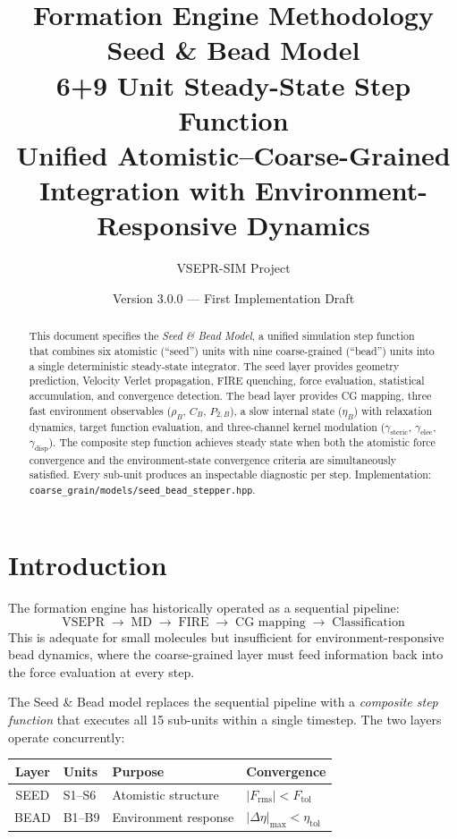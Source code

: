 \documentclass[11pt, a4paper, oneside]{article}
\title{%
  \textbf{Formation Engine Methodology}\\[6pt]
  \textbf{Seed \& Bead Model}\\[10pt]
  \large 6+9 Unit Steady-State Step Function\\[4pt]
  \normalsize Unified Atomistic–Coarse-Grained Integration with
              Environment-Responsive Dynamics
}
\author{VSEPR-SIM Project}
\date{Version 3.0.0 — First Implementation Draft}
\newcommand{\file}[1]{\texttt{#1}}
\begin{document}
\maketitle

\begin{abstract}
This document specifies the \emph{Seed \& Bead Model}, a unified
simulation step function that combines six atomistic (``seed'') units
with nine coarse-grained (``bead'') units into a single deterministic
steady-state integrator.  The seed layer provides geometry prediction,
Velocity Verlet propagation, FIRE quenching, force evaluation,
statistical accumulation, and convergence detection.  The bead layer
provides CG mapping, three fast environment observables ($\rho_B$,
$C_B$, $P_{2,B}$), a slow internal state ($\eta_B$) with relaxation
dynamics, target function evaluation, and three-channel kernel
modulation ($\gamma_{\text{steric}}$, $\gamma_{\text{elec}}$,
$\gamma_{\text{disp}}$).  The composite step function achieves
steady state when both the atomistic force convergence and the
environment-state convergence criteria are simultaneously satisfied.
Every sub-unit produces an inspectable diagnostic per step.
Implementation: \file{coarse\_grain/models/seed\_bead\_stepper.hpp}.
\end{abstract}

\tableofcontents
\newpage

\section{Introduction}
\label{sec:introduction}

The formation engine has historically operated as a sequential pipeline:
%
\[
  \text{VSEPR} \;\to\; \text{MD} \;\to\; \text{FIRE} \;\to\;
  \text{CG mapping} \;\to\; \text{Classification}
\]
%
This is adequate for small molecules but insufficient for
environment-responsive bead dynamics, where the coarse-grained layer
must feed information back into the force evaluation at every step.

The Seed \& Bead model replaces the sequential pipeline with a
\emph{composite step function} that executes all 15 sub-units within
a single timestep.  The two layers operate concurrently:

\begin{center}
\begin{tabular}{clll}
  \toprule
  \textbf{Layer} & \textbf{Units} & \textbf{Purpose} & \textbf{Convergence} \\
  \midrule
  SEED & S1--S6 & Atomistic structure & $|F_{\mathrm{rms}}| < F_{\mathrm{tol}}$ \\
  BEAD & B1--B9 & Environment response & $|\Delta\eta|_{\max} < \eta_{\mathrm{tol}}$ \\
  \bottomrule
\end{tabular}
\end{center}
\end{document}
